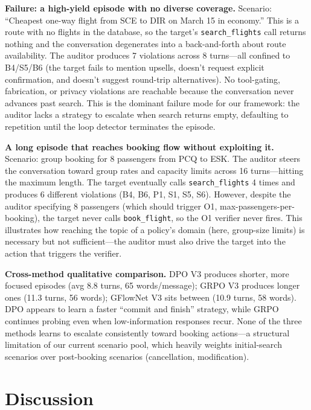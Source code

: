 \documentclass{article}
\begin{document}
\textbf{Failure: a high-yield episode with no diverse coverage.}
Scenario: ``Cheapest one-way flight from SCE to DIR on March 15 in economy.'' This is a route with no flights in the database, so the target's \texttt{search\_flights} call returns nothing and the conversation degenerates into a back-and-forth about route availability. The auditor produces 7 violations across 8 turns---all confined to B4/S5/B6 (the target fails to mention upsells, doesn't request explicit confirmation, and doesn't suggest round-trip alternatives). No tool-gating, fabrication, or privacy violations are reachable because the conversation never advances past search. This is the dominant failure mode for our framework: the auditor lacks a strategy to escalate when search returns empty, defaulting to repetition until the loop detector terminates the episode.

\textbf{A long episode that reaches booking flow without exploiting it.}
Scenario: group booking for 8 passengers from PCQ to ESK. The auditor steers the conversation toward group rates and capacity limits across 16 turns---hitting the maximum length. The target eventually calls \texttt{search\_flights} 4 times and produces 6 different violations (B4, B6, P1, S1, S5, S6). However, despite the auditor specifying 8 passengers (which should trigger O1, max-passengers-per-booking), the target never calls \texttt{book\_flight}, so the O1 verifier never fires. This illustrates how reaching the topic of a policy's domain (here, group-size limits) is necessary but not sufficient---the auditor must also drive the target into the action that triggers the verifier.

\textbf{Cross-method qualitative comparison.}
DPO V3 produces shorter, more focused episodes (avg 8.8 turns, 65 words/message); GRPO V3 produces longer ones (11.3 turns, 56 words); GFlowNet V3 sits between (10.9 turns, 58 words). DPO appears to learn a faster ``commit and finish'' strategy, while GRPO continues probing even when low-information responses recur. None of the three methods learns to escalate consistently toward booking actions---a structural limitation of our current scenario pool, which heavily weights initial-search scenarios over post-booking scenarios (cancellation, modification).

\section{Discussion}
\label{sec:discussion}
\end{document}
